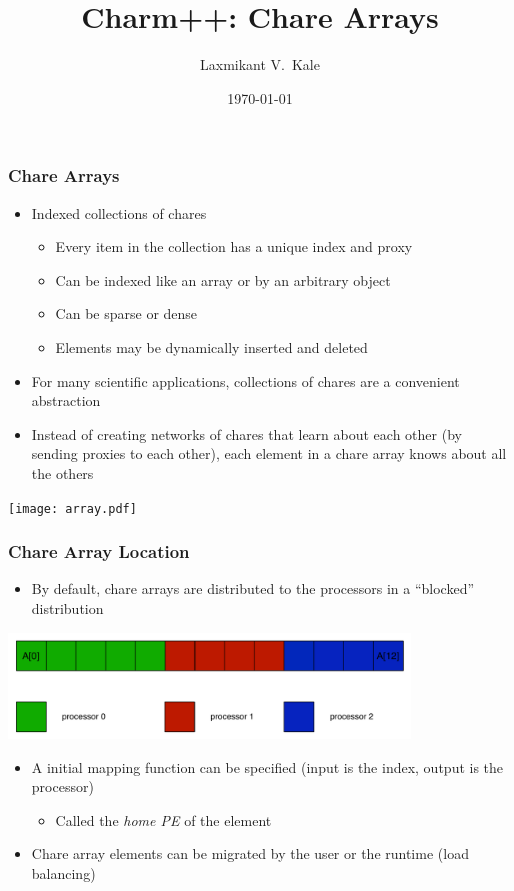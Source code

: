 \documentclass{beamer}
\title{Charm++: Chare Arrays}
\subtitle{}
\author[Laxmikant V.~Kale]{
Laxmikant V.~Kale
}
\date{\today}
\begin{document}
\begin{frame}[fragile]
  \frametitle{Chare Arrays}
  \begin{itemize}
    \item Indexed collections of chares
      \begin{itemize}
      \item Every item in the collection has a unique index and proxy
      \item Can be indexed like an array or by an arbitrary object
      \item Can be sparse or dense
      \item Elements may be dynamically inserted and deleted
      \end{itemize}
    \item For many scientific applications, collections of chares are a
      convenient abstraction
    \item Instead of creating networks of chares that learn about each other
      (by sending proxies to each other), each element in a chare array knows
      about all the others
  \end{itemize}
\end{frame}

\begin{frame}
  \begin{center} \texttt{[image: array.pdf]} \end{center}
\end{frame}

\begin{frame}
  \frametitle{Chare Array Location}
  \begin{itemize}
  \item By default, chare arrays are distributed to the processors in a
    ``blocked'' distribution
  \end{itemize}
  \begin{center} \includegraphics[width=0.8\textwidth]{diagrams/blockedDist.pdf} \end{center}
  \begin{itemize}
  \item A initial mapping function can be specified (input is the index, output
    is the processor)
    \begin{itemize}
    \item Called the \emph{home PE} of the element
    \end{itemize}
  \item Chare array elements can be migrated by the user or the runtime (load balancing)
  \end{itemize}
\end{frame}
\end{document}
